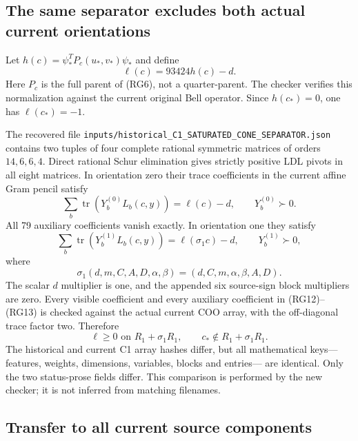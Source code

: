 \subsection{The same separator excludes both actual current orientations}

Let $h(c)=\psi_*^TP_c(u_*,v_*)\psi_*$ and define
\[
                  \ell(c)=93424h(c)-d.                            \tag{RG11}
\]
Here $P_c$ is the full parent of (RG6), not a quarter-parent.
The checker verifies this normalization against the current original
Bell operator.  Since $h(c_*)=0$, one has $\ell(c_*)=-1$.

The recovered file
\nolinkurl{inputs/historical_C1_SATURATED_CONE_SEPARATOR.json}
contains two tuples of four complete rational symmetric matrices of
orders $14,6,6,4$.  Direct rational Schur elimination gives strictly
positive LDL pivots in all eight matrices.  In orientation zero their
trace coefficients in the current affine Gram pencil satisfy
\[
 \sum_b\operatorname{tr}(Y_b^{(0)}L_b(c,y))=\ell(c)-d,
 \qquad Y_b^{(0)}\succ0.                                          \tag{RG12}
\]
All 79 auxiliary coefficients vanish exactly.  In orientation one they
satisfy
\[
 \sum_b\operatorname{tr}(Y_b^{(1)}L_b(c,y))=\ell(\sigma_1c)-d,
 \qquad Y_b^{(1)}\succ0,                                          \tag{RG13}
\]
where
\[
 \sigma_1(d,m,C,A,D,\alpha,\beta)
       =(d,C,m,\alpha,\beta,A,D).                                 \tag{RG14}
\]
The scalar $d$ multiplier is one, and the appended six source-sign
block multipliers are zero.  Every visible coefficient and every
auxiliary coefficient in (RG12)--(RG13) is checked against the actual
current COO array, with the off-diagonal trace factor two.
Therefore
\[
 \ell\geq0\text{ on }R_1+\sigma_1R_1,\qquad
 c_*\notin R_1+\sigma_1R_1.                                      \tag{RG15}
\]
The historical and current C1 array hashes differ, but all mathematical
keys---features, weights, dimensions, variables, blocks and entries---
are identical.  Only the two status-prose fields differ.  This
comparison is performed by the new checker; it is not inferred from
matching filenames.

\subsection{Transfer to all current source components}

